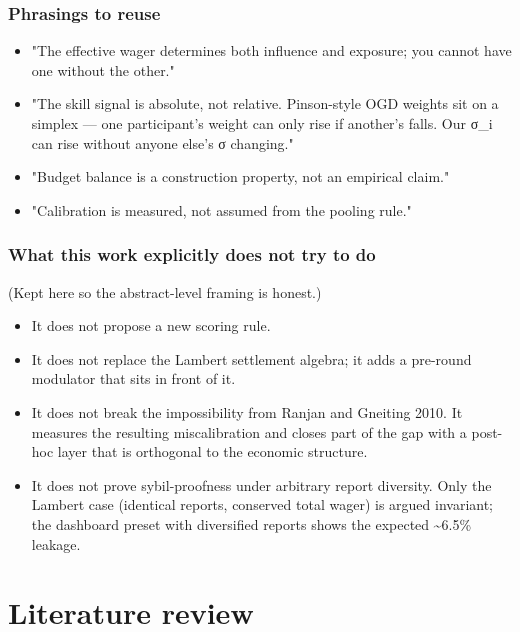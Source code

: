 \documentclass[11pt,a4paper,openany]{report}
\begin{document}
\section{Phrasings to reuse}

\begin{itemize}
  \item "The effective wager determines both influence and exposure; you cannot
    have one without the other."
  \item "The skill signal is absolute, not relative. Pinson-style OGD weights
    sit on a simplex — one participant's weight can only rise if another's
    falls. Our σ\_i can rise without anyone else's σ changing."
  \item "Budget balance is a construction property, not an empirical claim."
  \item "Calibration is measured, not assumed from the pooling rule."
\end{itemize}

\section{What this work explicitly does not try to do}

(Kept here so the abstract-level framing is honest.)

\begin{itemize}
  \item It does not propose a new scoring rule.
  \item It does not replace the Lambert settlement algebra; it adds a pre-round
    modulator that sits in front of it.
  \item It does not break the impossibility from Ranjan and Gneiting 2010. It
    measures the resulting miscalibration and closes part of the gap with
    a post-hoc layer that is orthogonal to the economic structure.
  \item It does not prove sybil-proofness under arbitrary report diversity.
    Only the Lambert case (identical reports, conserved total wager) is
    argued invariant; the dashboard preset with diversified reports shows
    the expected \textasciitilde{}6.5\% leakage.
\end{itemize}

\part*{Literature review}
\end{document}
